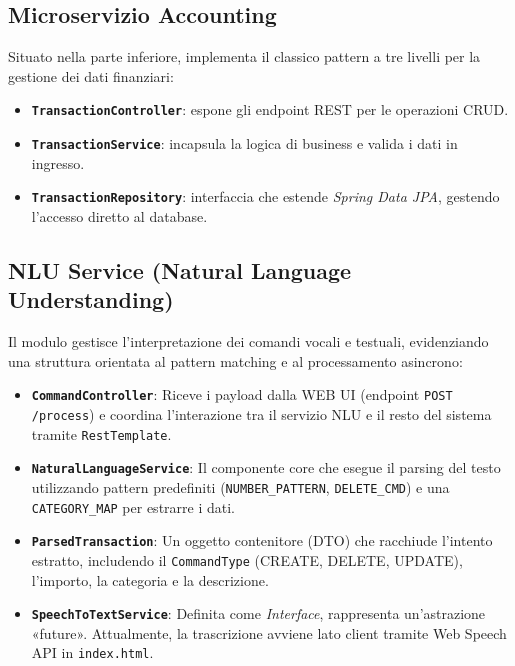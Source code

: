 \subsection{Microservizio Accounting}
Situato nella parte inferiore, implementa il classico pattern a tre livelli per la gestione dei dati finanziari:
\begin{itemize}
    \item \textbf{\texttt{TransactionController}}: espone gli endpoint REST per le operazioni CRUD.
    \item \textbf{\texttt{TransactionService}}: incapsula la logica di business e valida i dati in ingresso.
    \item \textbf{\texttt{TransactionRepository}}: interfaccia che estende \textit{Spring Data JPA}, gestendo l'accesso diretto al database.
\end{itemize}

\subsection{NLU Service (Natural Language Understanding)}
Il modulo gestisce l'interpretazione dei comandi vocali e testuali, evidenziando una struttura orientata al pattern matching e al processamento asincrono:
\begin{itemize}
    \item \textbf{\texttt{CommandController}}: Riceve i payload dalla WEB UI (endpoint \texttt{POST /process}) e coordina l'interazione tra il servizio NLU e il resto del sistema tramite \texttt{RestTemplate}.
    \item \textbf{\texttt{NaturalLanguageService}}: Il componente core che esegue il parsing del testo utilizzando pattern predefiniti (\texttt{NUMBER\_PATTERN}, \texttt{DELETE\_CMD}) e una \texttt{CATEGORY\_MAP} per estrarre i dati.
    \item \textbf{\texttt{ParsedTransaction}}: Un oggetto contenitore (DTO) che racchiude l'intento estratto, includendo il \texttt{CommandType} (CREATE, DELETE, UPDATE), l'importo, la categoria e la descrizione.
    \item \textbf{\texttt{SpeechToTextService}}: Definita come \textit{Interface}, rappresenta un'astrazione «future». Attualmente, la trascrizione avviene lato client tramite Web Speech API in \texttt{index.html}.
\end{itemize}

